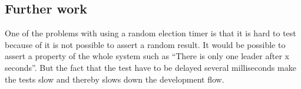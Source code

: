 \subsection{Further work}

One of the problems with using a random election timer is that it is hard to test because of it is not possible to assert a random result. It would be possible to assert a property of the whole system such as ``There is only one leader after x seconds''. But the fact that the test have to be delayed several milliseconds make the tests slow and thereby slows down the development flow.


%

